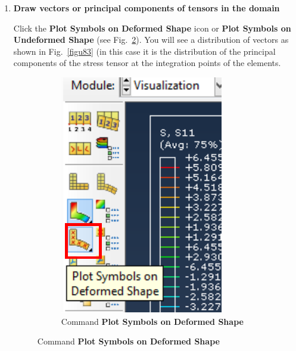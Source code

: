 \begin{enumerate}
\item \textbf{Draw vectors or principal components of tensors in
    the domain} ~

  Click the \textbf{Plot Symbols on Deformed Shape} icon or
  \textbf{Plot Symbols on Undeformed Shape} (see
  Fig.~\ref{figu82}). You will see a distribution of vectors as shown
  in Fig.~\ref{figu83} (in this case it is the distribution of the
  principal components of the stress tensor at the integration points
  of the elements.

  \begin{figure}[H]
    \begin{subfigure}{0.29\textwidth}
      \includegraphics[width=\textwidth]{./body/images/imagen82.pdf}
      \caption{Command \textbf{Plot Symbols on Deformed Shape}}
      \label{figu82}
    \end{subfigure}%

\end{figure}
\end{enumerate}
